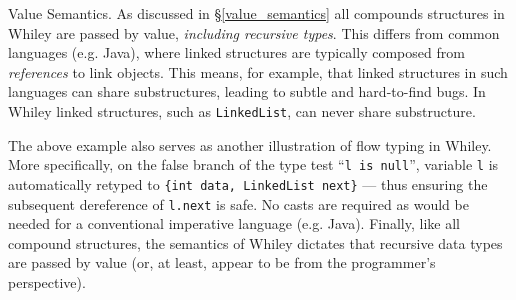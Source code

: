 \begin{insight}{Value Semantics.}
  As discussed in \S\ref{value_semantics} all compounds structures in
  Whiley are passed by value, {\em including recursive types}.  This
  differs from common languages (e.g. Java), where linked structures
  are typically composed from {\em references} to link objects.  This
  means, for example, that linked structures in such languages can
  share substructures, leading to subtle and hard-to-find bugs.  In
  Whiley linked structures, such as \lstinline{LinkedList}, can never
  share substructure.
\end{insight}

The above example also serves as another illustration of flow typing
in Whiley.  More specifically, on the false branch of the type test
``\lstinline{l is null}'', variable \lstinline{l} is automatically
retyped to \lstinline+{int data, LinkedList next}+ --- thus ensuring
the subsequent dereference of \lstinline{l.next} is safe.  No casts
are required as would be needed for a conventional imperative language
(e.g. Java).  Finally, like all compound structures, the semantics of
Whiley dictates that recursive data types are passed by value (or, at
least, appear to be from the programmer's perspective).

%
%
%
%

